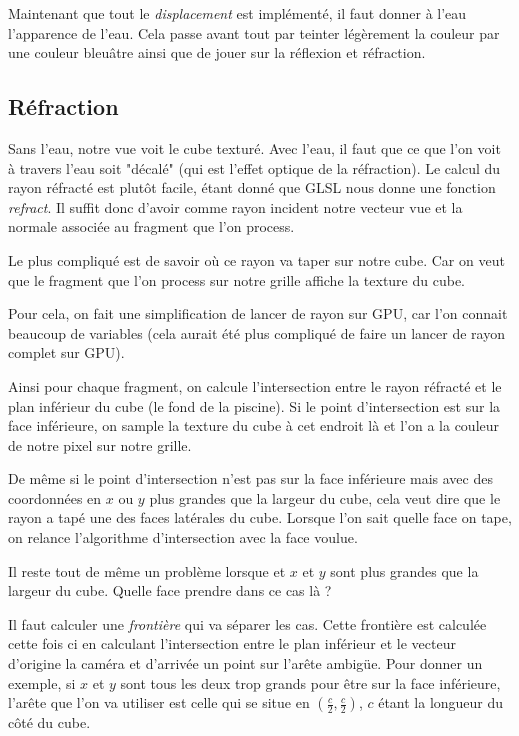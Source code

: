 \documentclass[a4paper,11pt,leqno]{article}
\begin{document}
Maintenant que tout le \emph{displacement} est implémenté, il faut donner à l'eau l'apparence de l'eau. Cela passe avant tout par teinter légèrement la couleur par une couleur bleuâtre ainsi que de jouer sur la réflexion et réfraction.

\subsection{Réfraction}

Sans l'eau, notre vue voit le cube texturé. Avec l'eau, il faut que ce que l'on voit à travers l'eau soit "décalé" (qui est l'effet optique de la réfraction). Le calcul du rayon réfracté est plutôt facile, étant donné que GLSL nous donne une fonction \emph{refract}. Il suffit donc d'avoir comme rayon incident notre vecteur vue et la normale associée au fragment que l'on process.

Le plus compliqué est de savoir où ce rayon va taper sur notre cube. Car on veut que le fragment que l'on process sur notre grille affiche la texture du cube.

Pour cela, on fait une simplification de lancer de rayon sur GPU, car l'on connait beaucoup de variables (cela aurait été plus compliqué de faire un lancer de rayon complet sur GPU).

Ainsi pour chaque fragment, on calcule l'intersection entre le rayon réfracté et le plan inférieur du cube (le fond de la piscine). Si le point d'intersection est sur la face inférieure, on sample la texture du cube à cet endroit là et l'on a la couleur de notre pixel sur notre grille.

De même si le point d'intersection n'est pas sur la face inférieure mais avec des coordonnées en $x$ ou $y$ plus grandes que la largeur du cube, cela veut dire que le rayon a tapé une des faces latérales du cube. Lorsque l'on sait quelle face on tape, on relance l'algorithme d'intersection avec la face voulue.

Il reste tout de même un problème lorsque et $x$ et $y$ sont plus grandes que la largeur du cube. Quelle face prendre dans ce cas là ?

Il faut calculer une \emph{frontière} qui va séparer les cas. Cette frontière est calculée cette fois ci en calculant l'intersection entre le plan inférieur et le vecteur d'origine la caméra et d'arrivée un point sur l'arête ambigüe. Pour donner un exemple, si $x$ et $y$ sont tous les deux trop grands pour être sur la face inférieure, l'arête que l'on va utiliser est celle qui se situe en $(\frac{c}{2}, \frac{c}{2})$, $c$ étant la longueur du côté du cube.
\end{document}
